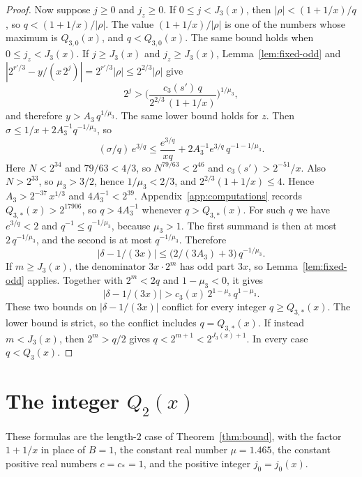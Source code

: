 \documentclass[11pt]{article}
\begin{document}
\begin{proof}
Now suppose $j \ge 0$ and $j_z \ge 0$.
If $0 \le j < J_3(x)$, then $|\rho| < (1+1/x)/q$, so $q < (1+1/x)/|\rho|$.
The value $(1+1/x)/|\rho|$ is one of the numbers whose maximum is $Q_{3,0}(x)$, and $q < Q_{3,0}(x)$.
The same bound holds when $0 \le j_z < J_3(x)$.
If $j \ge J_3(x)$ and $j_z \ge J_3(x)$, Lemma~\ref{lem:fixed-odd} and $|2^{r'/3} - y/(x\, 2^j)| = 2^{r'/3}|\rho| \le 2^{2/3}|\rho|$ give
\[
2^{j} > \Biggl( \frac{c_3(s')\, q}{2^{2/3}\,(1+1/x)} \Biggr)^{1/\mu_3},
\]
and therefore $y > A_3\, q^{1/\mu_3}$.
The same lower bound holds for $z$.
Then $\sigma \le 1/x + 2 A_3^{-1} q^{-1/\mu_3}$, so
\[
(\sigma/q)\, e^{3/q} \le \frac{e^{3/q}}{xq} + 2 A_3^{-1} e^{3/q}\, q^{-1-1/\mu_3}.
\]
Here $N < 2^{34}$ and $79/63 < 4/3$, so $N^{79/63} < 2^{46}$ and $c_3(s') > 2^{-51}/x$.
Also $N > 2^{33}$, so $\mu_3 > 3/2$, hence $1/\mu_3 < 2/3$, and $2^{2/3}(1+1/x) \le 4$.
Hence $A_3 > 2^{-37}\, x^{1/3}$ and $4A_3^{-1} < 2^{39}$.
Appendix~\ref{app:computations} records $Q_{3,*}(x) > 2^{17906}$, so $q > 4A_3^{-1}$ whenever $q > Q_{3,*}(x)$.
For such $q$ we have $e^{3/q} < 2$ and $q^{-1} \le q^{-1/\mu_3}$, because $\mu_3 > 1$.
The first summand is then at most $2\, q^{-1/\mu_3}$, and the second is at most $q^{-1/\mu_3}$.
Therefore
\[
\bigl|\delta - 1/(3x)\bigr| \le \bigl(2/(3A_3) + 3\bigr)\, q^{-1/\mu_3}.
\]
If $m \ge J_3(x)$, the denominator $3x \cdot 2^m$ has odd part $3x$, so Lemma~\ref{lem:fixed-odd} applies.
Together with $2^m < 2q$ and $1 - \mu_3 < 0$, it gives
\[
\bigl|\delta - 1/(3x)\bigr| > c_3(x)\, 2^{1-\mu_3}\, q^{1-\mu_3}.
\]
These two bounds on $|\delta - 1/(3x)|$ conflict for every integer $q \ge Q_{3,*}(x)$.
The lower bound is strict, so the conflict includes $q = Q_{3,*}(x)$.
If instead $m < J_3(x)$, then $2^m > q/2$ gives $q < 2^{m+1} < 2^{J_3(x)+1}$.
In every case $q < Q_3(x)$.
\end{proof}

\section{The integer $Q_2(x)$}
\label{sec:q2}

These formulas are the length-$2$ case of Theorem~\ref{thm:bound}, with the factor $1+1/x$ in place of $B = 1$, the constant real number $\mu = 1.465$, the constant positive real numbers $c = c_* = 1$, and the positive integer $j_0 = j_0(x)$.
\end{document}
